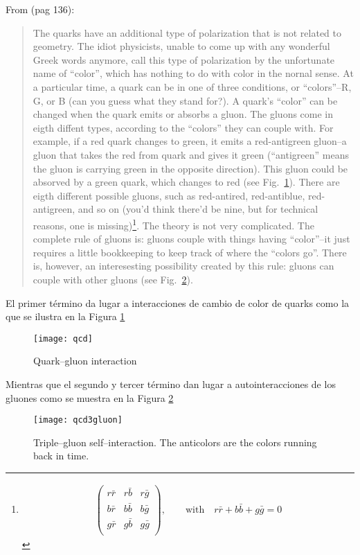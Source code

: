 \begin{frame}
From \cite{Feynman:1986er} (pag 136):
\begin{quote}
  The quarks have an additional type of polarization that is not
  related to geometry. The idiot physicists, unable to come up with
  any wonderful Greek words anymore, call this type of polarization by
  the unfortunate name of ``color'', which has nothing to do with
  color in the nornal sense. At a particular time, a quark can be in
  one of three conditions, or ``colors''--R, G, or B (can you guess
  what they stand for?). A quark's ``color'' can be changed when the
  quark emits or absorbs a gluon. The gluons come in eigth diffent
  types, according to the ``colors'' they can couple with. For
  example, if a red quark changes to green, it emits a red-antigreen
  gluon--a gluon that takes the red from quark and gives it green
  (``antigreen'' means the gluon is carrying green in the opposite
  direction). This gluon could be absorved by a green quark, which
  changes to red (see Fig.~\ref{fig:qcd}). There are eigth different
  possible gluons, such as red-antired, red-antiblue, red-antigreen,
  and so on (you'd think there'd be nine, but for technical reasons,
  one is missing)\footnote{
    \begin{align*}
      \begin{pmatrix}
        r\bar{r} & r\bar{b} &r\bar{g}\\ 
        b\bar{r} & b\bar{b} &b\bar{g}\\ 
        g\bar{r} & g\bar{b} &g\bar{g}\\ 
      \end{pmatrix},\qquad\text{with}\quad r\bar{r}+b\bar{b}+g\bar{g}=0
    \end{align*}
}. The theory is not very complicated.  The complete rule of gluons is: gluons couple with things having ``color''--it just requires a little bookkeeping to keep track of where the ``colors go''.  There is, however, an interesesting possibility created by this rule: gluons can couple with other gluons (see Fig.~\ref{fig:qcd3gluon}).
\end{quote}
\end{frame}

El primer término da lugar a interacciones de cambio de color de quarks como la que se ilustra en la Figura \ref{fig:qcd}
\begin{frame}  
\begin{figure}
  \centering
  \texttt{[image: qcd]} %
  \caption{Quark--gluon interaction}
  \label{fig:qcd}
\end{figure}
\end{frame}
Mientras que el segundo y tercer término dan lugar a autointeracciones de los gluones como se muestra en la Figura \ref{fig:qcd3gluon}
\begin{frame}
\begin{figure}
  \centering
  \texttt{[image: qcd3gluon]}%
  \caption{Triple--gluon self--interaction. The anticolors are the colors running back in time.}
  \label{fig:qcd3gluon}
\end{figure}
\end{frame}


